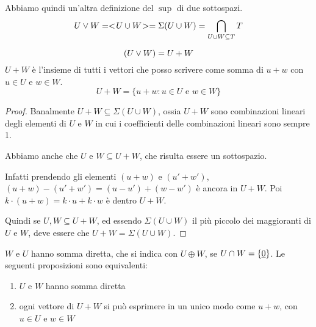 Abbiamo quindi un'altra definizione del $\sup$ di due sottospazi.
\[
U \vee W = <\!{U \cup W}\!> = \Sigma(U \cup W) = \bigcap_{U \cup W \subseteq T} T
\]
\begin{prop}
\[
(U \vee W) = U + W
\]
$U + W$ \`e l'insieme di tutti i vettori che posso scrivere come somma di $u + w$ con $u \in U$ e $w \in W$.
\[
U + W = \{ u + w : u \in U \text{ e } w \in W \}
\]
\end{prop}
\begin{proof}
Banalmente $U + W \subseteq \Sigma(U \cup W)$, ossia $U + W$ sono combinazioni lineari degli elementi di $U$ e $W$ in cui i coefficienti delle combinazioni lineari sono sempre 1.

Abbiamo anche che $U$ e $W \subseteq U + W$, che risulta essere un sottospazio.

Infatti prendendo gli elementi $(u + w)$ e $(u' + w')$, $(u + w) - (u' + w') = (u - u') + (w - w')$ \`e ancora in $U + W$. Poi $k \cdot (u + w) = k \cdot u + k \cdot w$ \`e dentro $U + W$.

Quindi se $U, W \subseteq U + W$, ed essendo $\Sigma(U \cup W)$ il pi\`u piccolo dei maggioranti di $U$ e $W$, deve essere che $U + W = \Sigma(U \cup W)$.
\end{proof}
\begin{prop}
$W$ e $U$ hanno somma diretta, che si indica con $U \oplus W$, se $ U \cap W = \{ \underline{0}\}$. Le seguenti proposizioni sono equivalenti:
\begin{enumerate}
    \item\label{somma_diretta_1} $U$ e $W$ hanno somma diretta
    \item\label{somma_diretta_2} ogni vettore di $U + W$ si pu\`o esprimere in un unico modo come $u + w$, con $u \in U$ e $w \in W$
\end{enumerate}
\end{prop}
